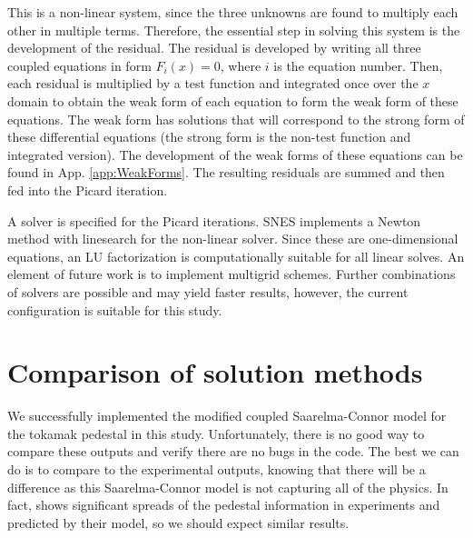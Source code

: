 \documentclass[twocolumn,secnumarabic,amssymb, nobibnotes, aps, prd]{revtex4-2}
\begin{document}
This is a non-linear system, since the three unknowns are found to multiply each other in multiple terms.
Therefore, the essential step in solving this system is the development of the residual. 
The residual is developed by writing all three coupled equations in form $F_i(x)=0$, where $i$ is the equation number.
Then, each residual is multiplied by a test function and integrated once over the $x$ domain to obtain the weak form of each equation to form the weak form of these equations. 
The weak form has solutions that will correspond to the strong form of these differential equations (the strong form is the non-test function and integrated version).
The development of the weak forms of these equations can be found in App. \ref{app:WeakForms}. 
The resulting residuals are summed and then fed into the Picard iteration.

A solver is specified for the Picard iterations. 
SNES implements a Newton method with linesearch for the non-linear solver.
Since these are one-dimensional equations, an LU factorization is computationally suitable for all linear solves. 
An element of future work is to implement multigrid schemes.
Further combinations of solvers are possible and may yield faster results, however, the current configuration is suitable for this study.


\section{Comparison of solution methods}
We successfully implemented the modified coupled Saarelma-Connor model for the tokamak pedestal in this study.
Unfortunately, there is no good way to compare these outputs and verify there are no bugs in the code. 
The best we can do is to compare to the experimental outputs, knowing that there will be a difference as this Saarelma-Connor model is not capturing all of the physics.
In fact, \cite{saarelma2023testing} shows significant spreads of the pedestal information in experiments and predicted by their model, so we should expect similar results.
\end{document}
